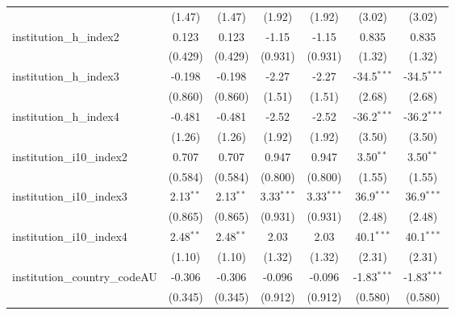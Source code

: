 \begin{tabular}{lcccccc}
                                         & (1.47)        & (1.47)        & (1.92)        & (1.92)        & (3.02)        & (3.02)\\   
   institution\_h\_index2                & 0.123         & 0.123         & -1.15         & -1.15         & 0.835         & 0.835\\   
                                         & (0.429)       & (0.429)       & (0.931)       & (0.931)       & (1.32)        & (1.32)\\   
   institution\_h\_index3                & -0.198        & -0.198        & -2.27         & -2.27         & -34.5$^{***}$ & -34.5$^{***}$\\   
                                         & (0.860)       & (0.860)       & (1.51)        & (1.51)        & (2.68)        & (2.68)\\   
   institution\_h\_index4                & -0.481        & -0.481        & -2.52         & -2.52         & -36.2$^{***}$ & -36.2$^{***}$\\   
                                         & (1.26)        & (1.26)        & (1.92)        & (1.92)        & (3.50)        & (3.50)\\   
   institution\_i10\_index2              & 0.707         & 0.707         & 0.947         & 0.947         & 3.50$^{**}$   & 3.50$^{**}$\\   
                                         & (0.584)       & (0.584)       & (0.800)       & (0.800)       & (1.55)        & (1.55)\\   
   institution\_i10\_index3              & 2.13$^{**}$   & 2.13$^{**}$   & 3.33$^{***}$  & 3.33$^{***}$  & 36.9$^{***}$  & 36.9$^{***}$\\   
                                         & (0.865)       & (0.865)       & (0.931)       & (0.931)       & (2.48)        & (2.48)\\   
   institution\_i10\_index4              & 2.48$^{**}$   & 2.48$^{**}$   & 2.03          & 2.03          & 40.1$^{***}$  & 40.1$^{***}$\\   
                                         & (1.10)        & (1.10)        & (1.32)        & (1.32)        & (2.31)        & (2.31)\\   
   institution\_country\_codeAU          & -0.306        & -0.306        & -0.096        & -0.096        & -1.83$^{***}$ & -1.83$^{***}$\\   
                                         & (0.345)       & (0.345)       & (0.912)       & (0.912)       & (0.580)       & (0.580)\\   

\end{tabular}
